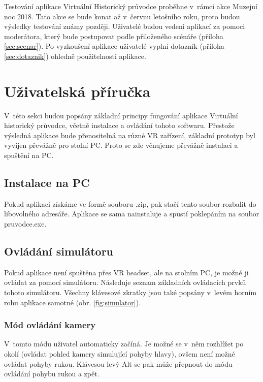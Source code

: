 \documentclass[thesis=B,czech]{FITthesis}[2012/06/26]
\begin{document}
	Testování aplikace Virtuální Historický průvodce proběhne v~rámci akce Muzejní noc 2018. Tato akce se bude konat až v~červnu letošního roku, proto budou výsledky testování známy později. Uživatelé budou vedeni aplikací za pomoci moderátora, který bude postupovat podle přiloženého scénáře (příloha \ref{sec:scenar}). Po vyzkoušení aplikace uživatelé vyplní dotazník (příloha \ref{sec:dotaznik}) ohledně použitelnosti aplikace.

	\section{Uživatelská příručka}
	
	V~této sekci budou popsány základní principy fungování aplikace Virtuální historický průvodce, včetně instalace a ovládání tohoto softwaru. Přestože výsledná aplikace bude přenositelná na různé VR zařízení, základní prototyp byl vyvíjen převážně pro stolní PC. Proto se zde věnujeme převážně instalaci a spuštění na PC.

\subsection{Instalace na PC}	
	Pokud aplikaci získáme ve formě souboru .zip, pak stačí tento soubor rozbalit do libovolného adresáře. Aplikace se sama nainstaluje a spustí poklepáním na soubor pruvodce.exe.
	
\subsection{Ovládání simulátoru}
Pokud aplikace není spuštěna přes VR headset, ale na stolním PC, je možné ji ovládat za pomocí simulátoru.\cite{VRTK} Následuje seznam základních ovládacích prvků tohoto simulátoru. Všechny klávesové zkratky jsou také popsány v~levém horním rohu aplikace samotné (obr. \ref{fig:simulator}).

\subsubsection{Mód ovládání kamery}
V~tomto módu uživatel automaticky začíná. Je možné se v~něm rozhlížet po okolí (ovládat pohled kamery simulující pohyby hlavy), ovšem není možné ovládat pohyby rukou. Klávesou levý Alt se pak může přepnout do módu ovládání pohybu rukou a zpět.
\end{document}
